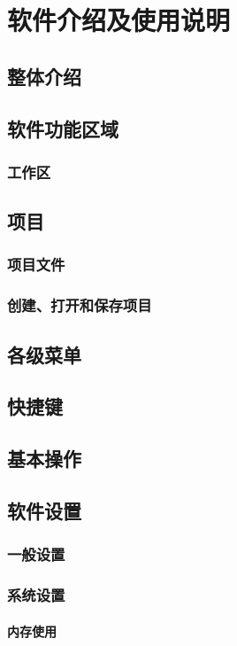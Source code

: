 \chapter{软件介绍及使用说明}

\section{整体介绍}
\section{软件功能区域}
\subsection{工作区}
\section{项目}
\subsection{项目文件}
\subsection{创建、打开和保存项目}
\section{各级菜单}
\section{快捷键}
\section{基本操作}

\section{软件设置}
\subsection{一般设置}
\subsection{系统设置}
\subsubsection{内存使用}
